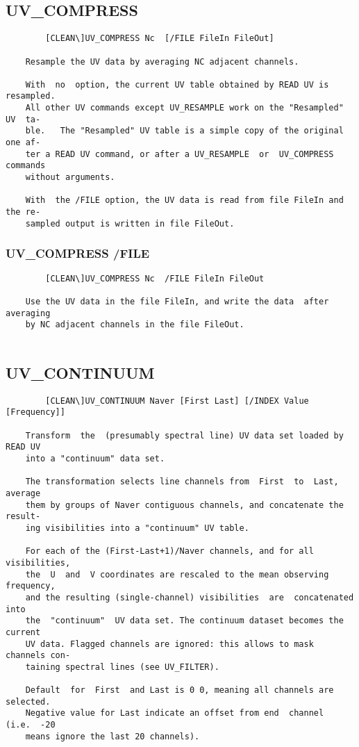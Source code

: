 \subsection{UV\_COMPRESS}
\begin{verbatim}
        [CLEAN\]UV_COMPRESS Nc  [/FILE FileIn FileOut]

    Resample the UV data by averaging NC adjacent channels.

    With  no  option, the current UV table obtained by READ UV is resampled.
    All other UV commands except UV_RESAMPLE work on the "Resampled" UV  ta-
    ble.   The "Resampled" UV table is a simple copy of the original one af-
    ter a READ UV command, or after a UV_RESAMPLE  or  UV_COMPRESS  commands
    without arguments.

    With  the /FILE option, the UV data is read from file FileIn and the re-
    sampled output is written in file FileOut.

\end{verbatim}
\subsubsection{UV\_COMPRESS /FILE}
\begin{verbatim}
        [CLEAN\]UV_COMPRESS Nc  /FILE FileIn FileOut

    Use the UV data in the file FileIn, and write the data  after  averaging
    by NC adjacent channels in the file FileOut.


\end{verbatim}
\subsection{UV\_CONTINUUM}
\begin{verbatim}
        [CLEAN\]UV_CONTINUUM Naver [First Last] [/INDEX Value [Frequency]]

    Transform  the  (presumably spectral line) UV data set loaded by READ UV
    into a "continuum" data set.

    The transformation selects line channels from  First  to  Last,  average
    them by groups of Naver contiguous channels, and concatenate the result-
    ing visibilities into a "continuum" UV table.

    For each of the (First-Last+1)/Naver channels, and for all visibilities,
    the  U  and  V coordinates are rescaled to the mean observing frequency,
    and the resulting (single-channel) visibilities  are  concatenated  into
    the  "continuum"  UV data set. The continuum dataset becomes the current
    UV data. Flagged channels are ignored: this allows to mask channels con-
    taining spectral lines (see UV_FILTER).

    Default  for  First  and Last is 0 0, meaning all channels are selected.
    Negative value for Last indicate an offset from end  channel  (i.e.  -20
    means ignore the last 20 channels).

\end{verbatim}
